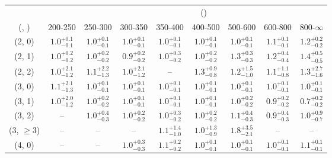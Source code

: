 \begin{table}[h!]
\tiny
\centering
{}
\begin{tabular}
{ccccccccc}
	\hline\hline
&	& \multicolumn{8}{c}{\scalht (\gev)} \\ 
	 (\njet,  \nb) & 200-250 & 250-300 & 300-350 & 350-400 & 400-500 & 500-600 & 600-800 & 800-$\infty$ \\ [0.8ex] 
\hline
	(2, 0) & $1.0^{+ 0.1 }_{- 0.1 }$ & $1.0^{+ 0.1 }_{- 0.1 }$ & $1.0^{+ 0.1 }_{- 0.1 }$ & $1.0^{+ 0.1 }_{- 0.1 }$ & $1.0^{+ 0.1 }_{- 0.1 }$ & $1.0^{+ 0.1 }_{- 0.1 }$ & $1.1^{+ 0.1 }_{- 0.1 }$ & $1.2^{+ 0.2 }_{- 0.2 }$ \\[0.5ex] 
	(2, 1) & $1.0^{+ 0.2 }_{- 0.2 }$ & $1.0^{+ 0.2 }_{- 0.2 }$ & $0.9^{+ 0.2 }_{- 0.2 }$ & $1.0^{+ 0.3 }_{- 0.2 }$ & $1.0^{+ 0.2 }_{- 0.2 }$ & $1.3^{+ 0.3 }_{- 0.3 }$ & $1.2^{+ 0.4 }_{- 0.4 }$ & $1.4^{+ 0.5 }_{- 0.5 }$ \\[0.5ex] 
	(2, 2) & $1.0^{+ 2.1 }_{- 1.2 }$ & $1.1^{+ 2.2 }_{- 1.3 }$ & $1.0^{+ 2.1 }_{- 1.2 }$ & -- & $1.3^{+ 0.9 }_{- 0.8 }$ & $1.2^{+ 1.5 }_{- 1.0 }$ & $1.1^{+ 1.1 }_{- 0.8 }$ & $1.3^{+ 2.7 }_{- 1.6 }$ \\[0.5ex] 
	(3, 0) & $1.1^{+ 2.1 }_{- 1.3 }$ & $1.0^{+ 0.1 }_{- 0.1 }$ & $1.0^{+ 0.1 }_{- 0.1 }$ & $1.0^{+ 0.1 }_{- 0.1 }$ & $1.0^{+ 0.1 }_{- 0.1 }$ & $1.0^{+ 0.1 }_{- 0.1 }$ & $1.0^{+ 0.1 }_{- 0.1 }$ & $1.0^{+ 0.1 }_{- 0.1 }$ \\[0.5ex] 
	(3, 1) & $1.0^{+ 2.0 }_{- 1.2 }$ & $1.0^{+ 0.2 }_{- 0.2 }$ & $1.0^{+ 0.1 }_{- 0.1 }$ & $1.0^{+ 0.1 }_{- 0.1 }$ & $1.0^{+ 0.1 }_{- 0.1 }$ & $1.0^{+ 0.2 }_{- 0.2 }$ & $0.9^{+ 0.2 }_{- 0.2 }$ & $0.7^{+ 0.2 }_{- 0.2 }$ \\[0.5ex] 
	(3, 2) & -- & $1.0^{+ 0.4 }_{- 0.3 }$ & $1.0^{+ 0.2 }_{- 0.2 }$ & $1.0^{+ 0.3 }_{- 0.2 }$ & $1.0^{+ 0.2 }_{- 0.2 }$ & $1.1^{+ 0.4 }_{- 0.3 }$ & $0.9^{+ 0.4 }_{- 0.3 }$ & $1.0^{+ 0.9 }_{- 0.7 }$ \\[0.5ex] 
	(3, $\ge3$) & -- & -- & -- & $1.1^{+ 1.4 }_{- 1.0 }$ & $1.0^{+ 1.3 }_{- 0.9 }$ & $1.8^{+ 3.5 }_{- 2.1 }$ & -- & -- \\[0.5ex] 
	(4, 0) & -- & -- & $1.0^{+ 0.3 }_{- 0.3 }$ & $1.1^{+ 0.2 }_{- 0.2 }$ & $1.0^{+ 0.1 }_{- 0.1 }$ & $1.0^{+ 0.1 }_{- 0.1 }$ & $1.0^{+ 0.1 }_{- 0.1 }$ & $1.1^{+ 0.1 }_{- 0.1 }$ \\[0.5ex] 

\end{tabular}
\end{table}
